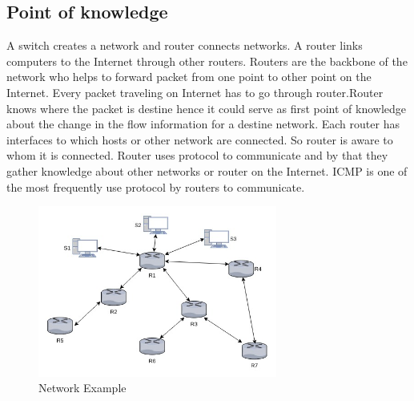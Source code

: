 \documentclass[12pt,oneside,a4paper]{article}
\begin{document}
\subsection{Point of knowledge}
A switch creates a network and router connects networks. A router links computers to the Internet through other routers. Routers are the backbone of the network who helps to forward packet from one point to other point on the Internet. Every packet traveling on Internet has to go through router\cite{router-switch}.Router knows where the packet is destine hence it could serve as first point of knowledge about the change in the flow information for a destine network. Each router has interfaces to which hosts or other network are connected. So router is aware to whom it is connected. Router uses protocol to communicate and by that they gather knowledge about other networks or router on the Internet. ICMP\cite{icmp} is one of the most frequently use protocol by routers to communicate.\par

\begin{figure}[H]
\centering
\includegraphics[width=0.70\textwidth]{routers.jpg}
\caption{Network Example} \label{fig:routers}
\end{figure}
\end{document}
